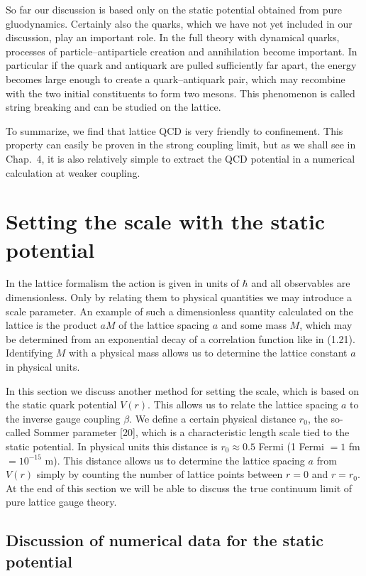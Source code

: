So far our discussion is based only on the static potential obtained from pure
gluodynamics. Certainly also the quarks, which we have not yet included in our
discussion, play an important role. In the full theory with dynamical quarks,
processes of particle--antiparticle creation and annihilation become important.
In particular if the quark and antiquark are pulled sufficiently far apart, the
energy becomes large enough to create a quark--antiquark pair, which may
recombine with the two initial constituents to form two mesons. This phenomenon
is called string breaking and can be studied on the lattice.

To summarize, we find that lattice QCD is very friendly to confinement. This
property can easily be proven in the strong coupling limit, but as we shall see
in Chap.~4, it is also relatively simple to extract the QCD potential in a
numerical calculation at weaker coupling.

\section{Setting the scale with the static potential}

In the lattice formalism the action is given in units of $\hbar$ and all
observables are dimensionless. Only by relating them to physical quantities we
may introduce a scale parameter. An example of such a dimensionless quantity
calculated on the lattice is the product $aM$ of the lattice spacing $a$ and
some mass $M$, which may be determined from an exponential decay of a
correlation function like in (1.21). Identifying $M$ with a physical mass
allows us to determine the lattice constant $a$ in physical units.

In this section we discuss another method for setting the scale, which is based
on the static quark potential $V(r)$. This allows us to relate the lattice
spacing $a$ to the inverse gauge coupling $\beta$. We define a certain physical
distance $r_0$, the so-called Sommer parameter [20], which is a characteristic
length scale tied to the static potential. In physical units this distance is
$r_0 \approx 0.5$ Fermi (1 Fermi $= 1$ fm $= 10^{-15}$ m). This distance allows
us to determine the lattice spacing $a$ from $V(r)$ simply by counting the
number of lattice points between $r = 0$ and $r = r_0$. At the end of this
section we will be able to discuss the true continuum limit of pure lattice
gauge theory.

\subsection{Discussion of numerical data for the static potential}

